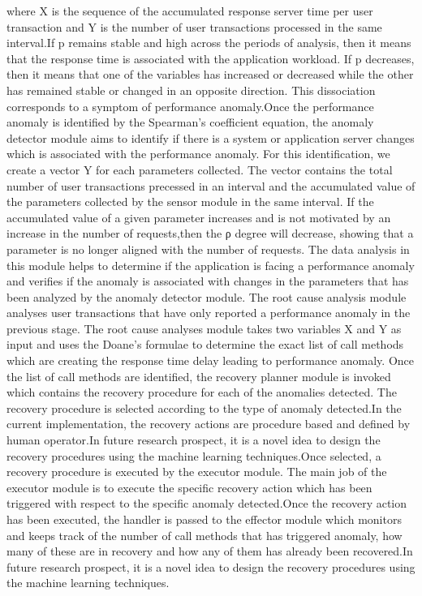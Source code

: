 \begin{compactitem}
where X is the sequence of the accumulated response server time per user transaction and Y is the number of user transactions processed in the same interval.If p remains stable and high across the periods of analysis, then it means that the response time is associated with the application workload. If p  decreases, then it means that one of the variables has increased or decreased while the other has remained stable or changed in an opposite direction. This dissociation corresponds to a symptom of performance anomaly.Once the performance anomaly is identified by the Spearman's coefficient equation, the anomaly detector module aims to identify if there is a system or application server changes which is associated with the performance anomaly. For this identification, we create a vector Y for each parameters collected. The vector contains the total number of user transactions precessed in an interval and the accumulated value of the parameters collected by the sensor module in the same interval. If the accumulated value of a given
parameter increases and is not motivated by an increase in the number of requests,then the ρ degree will decrease, showing that a parameter is no longer aligned with the number of requests. The data analysis in this module helps to determine if the application is facing a performance anomaly and verifies if the anomaly is associated with changes in the parameters that has been analyzed by the anomaly detector module. The root cause analysis module analyses user transactions that have only reported a performance anomaly in the previous stage. The root cause analyses module takes two variables X and Y as input and uses the Doane's formulae to determine the exact list of call methods which are creating the response time delay  leading to performance anomaly. Once the list of call methods are identified, the recovery planner module is invoked which contains the recovery procedure for each of the anomalies detected. The recovery procedure is selected according to the type of anomaly detected.In the current implementation, the recovery actions are procedure based and defined by human operator.In future research prospect, it is a novel idea to design the recovery procedures using the machine learning techniques.Once selected, a recovery procedure is executed by the executor module. The main job of the executor module is to execute the specific recovery action which has been triggered with respect to the specific anomaly detected.Once the recovery action has been executed, the handler is passed to the effector module which monitors and keeps track of the number of call methods that has triggered anomaly, how many
of these are in recovery and how any of them has already been recovered.In future research prospect, it is a novel idea to design the recovery procedures using the machine learning techniques.


\end{compactitem}
